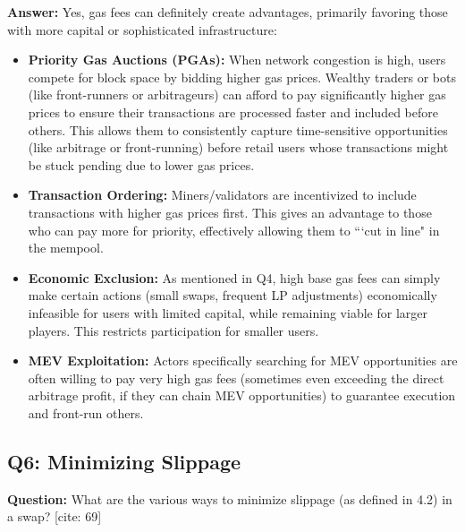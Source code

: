 \documentclass[12pt]{article}
\begin{document}
\textbf{Answer:} Yes, gas fees can definitely create advantages, primarily favoring those with more capital or sophisticated infrastructure:
\begin{itemize}
    \item \textbf{Priority Gas Auctions (PGAs):} When network congestion is high, users compete for block space by bidding higher gas prices. Wealthy traders or bots (like front-runners or arbitrageurs) can afford to pay significantly higher gas prices to ensure their transactions are processed faster and included before others. This allows them to consistently capture time-sensitive opportunities (like arbitrage or front-running) before retail users whose transactions might be stuck pending due to lower gas prices.
    \item \textbf{Transaction Ordering:} Miners/validators are incentivized to include transactions with higher gas prices first. This gives an advantage to those who can pay more for priority, effectively allowing them to ```cut in line" in the mempool.
    \item \textbf{Economic Exclusion:} As mentioned in Q4, high base gas fees can simply make certain actions (small swaps, frequent LP adjustments) economically infeasible for users with limited capital, while remaining viable for larger players. This restricts participation for smaller users.
    \item \textbf{MEV Exploitation:} Actors specifically searching for MEV opportunities are often willing to pay very high gas fees (sometimes even exceeding the direct arbitrage profit, if they can chain MEV opportunities) to guarantee execution and front-run others.
\end{itemize}

\subsection{Q6: Minimizing Slippage}
\textbf{Question:} What are the various ways to minimize slippage (as defined in 4.2) in a swap? [cite: 69]
\end{document}
